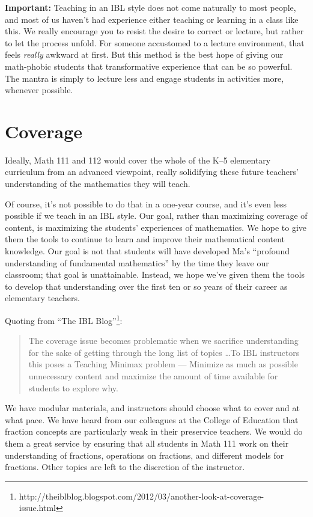\documentclass[12pt, reqno]{amsart}
\theoremstyle{remark}
\theoremstyle{definition}
\numberwithin{equation}{section}  %
\begin{document}
{\bf Important:} Teaching in an IBL style does not come naturally to most people, and most of us haven't had experience either teaching or learning in a class like this.  We really encourage you to resist the desire to correct or lecture, but rather to let the process unfold. For someone accustomed to a lecture environment, that feels \emph{really} awkward at first.
  But this method is the best hope of giving our math-phobic students that transformative experience that can be so powerful.  The mantra is simply to lecture less and engage students in activities more, whenever possible.  





\section{Coverage}
Ideally, Math 111 and 112 would cover the whole of the K--5 elementary curriculum from an advanced viewpoint, really solidifying these future teachers' understanding of the mathematics they will teach.

Of course, it's not possible to do that in a one-year course, and it's even less possible if we teach in an IBL style.  Our goal, rather than maximizing coverage of content, is maximizing the students' experiences of mathematics.  We hope to give them the tools to continue to learn and improve their mathematical content knowledge.  Our goal is not that students will have developed Ma's ``profound understanding of fundamental mathematics'' by the time they leave our classroom; that goal is unattainable.  Instead, we hope we've given them the tools to develop that understanding over the first ten or so years of their career as elementary teachers.

Quoting from ``The IBL Blog''\footnote{http://theiblblog.blogspot.com/2012/03/another-look-at-coverage-issue.html}:
\begin{quote}
The coverage issue becomes problematic when we sacrifice understanding for the sake of getting through the long list of topics \dots  To IBL instructors this poses a Teaching Minimax problem --- Minimize as much as possible unnecessary content and maximize the amount of time available for students to explore why.
\end{quote}

We have modular materials, and instructors should choose what to cover and at what pace.  We have heard from our colleagues at the College of Education that fraction concepts are particularly weak in their preservice teachers.  We would do them a great service by ensuring that all students in Math 111 work on their understanding of fractions, operations on fractions, and different models for fractions.  Other topics are left to the discretion of the instructor.
\end{document}
